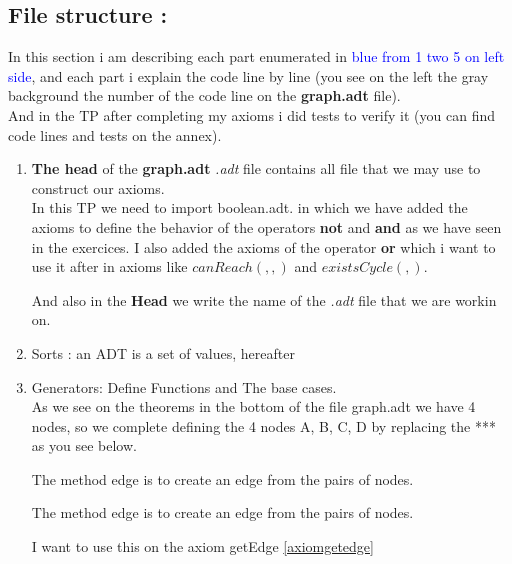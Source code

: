 \documentclass{article}
\begin{document}
\subsection{File structure :}
In this section i am describing each part enumerated in \textcolor{blue}{blue from 1 two 5 on left side}, and each part i explain the code line by line (you see on the left the gray background the number of the code line on the \textbf{graph.adt} file).\\
And in the TP after completing my axioms i did tests to verify it (you can find code lines and tests on the annex).
\begin{enumerate}[label=\color{blue}\theenumi]
\item \textbf{The head} of the  \textbf{graph.adt} \textit{.adt} file contains all file that we may use to construct our axioms.\\
In this TP we need to import {\textcolor{colour3}{boolean.adt}}.\label{importboolean}
\noindent
 in which we have added  the axioms to define the behavior of the operators \textbf{not} and \textbf{and} as we have seen in the exercices. I also added the axioms of the operator \textbf{or} which i want to use it after in axioms like $canReach(,,)$ and $existsCycle(,)$.

\bigskip
\noindent And also in the \textbf{Head} we write the name of the \textit {.adt} file that we are workin on.


\item \textcolor{colour0}{Sorts} \label{sort}: an ADT is a set of values, hereafter
\newpage
\item \textcolor{colour0}{Generators}\label{generator}: Define Functions and The base cases.\\
As we see on the theorems in the bottom of the file graph.adt we have 4 nodes, so we complete defining the 4 nodes A, B, C, D by replacing the *** as you see below.


\bigskip\noindent

The method edge is to create an edge from the pairs of nodes.\\
\bigskip\noindent

The method edge is to create an edge from the pairs of nodes.\\
\bigskip\noindent

\label{noedge}I want to use this on the axiom getEdge \ref{axiomgetedge}\\


\end{enumerate}
\end{document}
